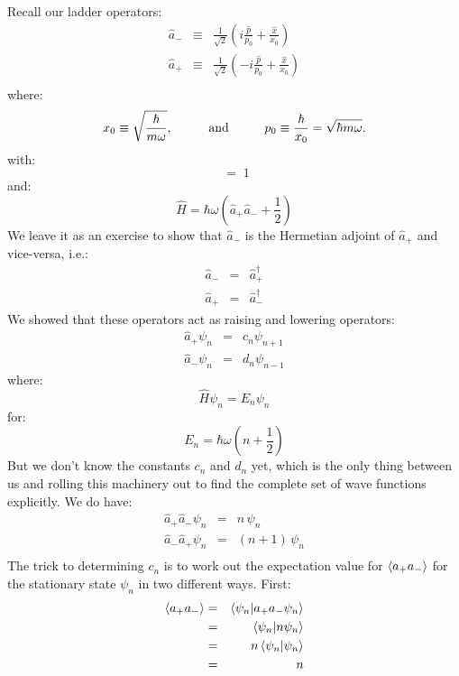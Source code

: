 \documentclass[12pt]{book}
\begin{document}
Recall our ladder operators:
\begin{eqnarray*}
\hat{a}_- &\equiv& \frac{1}{\sqrt{2}}\left(i \frac{\hat{p}}{p_0} + \frac{\hat{x}}{x_0}\right) \\
\hat{a}_+ &\equiv& \frac{1}{\sqrt{2}}\left(-i \frac{\hat{p}}{p_0} + \frac{\hat{x}}{x_0} \right) \\
\end{eqnarray*}
where:
$$x_0 \equiv \sqrt{\frac{\hbar}{m \omega}}, \hspace{1cm} {\rm and} \hspace{1cm} p_0 \equiv \frac{\hbar}{x_0} = \sqrt{\hbar m \omega}.$$
with:
\begin{equation*}
[\hat{a}_-, \hat{a}_+] \; = \;  1
\end{equation*}
and:
\begin{equation*}
\hat{H} =  \hbar\omega \left( \hat{a}_+ \hat{a}_- + \frac{1}{2} \right)
\end{equation*}
We leave it as an exercise to show that $\hat{a}_-$ is the Hermetian adjoint of $\hat{a}_+$ and vice-versa, i.e.:
\begin{eqnarray*}
\hat{a}_- &=& \hat{a}_+^\dagger\\
\hat{a}_+ &=& \hat{a}_-^\dagger
\end{eqnarray*}
We showed that these operators act as raising and lowering operators:
\begin{eqnarray*}
\hat{a}_+ \psi_n &=& c_n \psi_{n+1} \\
\hat{a}_- \psi_n &=& d_n \psi_{n-1} 
\end{eqnarray*}
where:
$$\hat{H}\psi_n = E_n \psi_n$$
for:
$$E_n = \hbar \omega \left(n + \frac{1}{2}\right)$$
But we don't know the constants $c_n$ and $d_n$ yet, which is the only thing between us and rolling this machinery out to find the complete set of wave functions explicitly.
We do have:
\begin{eqnarray*}
\hat{a}_+\hat{a}_- \psi_n &=& n \, \psi_{n} \\
\hat{a}_-\hat{a}_+ \psi_n &=& (n+1) \, \psi_{n} \\
\end{eqnarray*}
The trick to determining $c_n$ is to work out the expectation value for $\braket{a_+a_-}$ 
for the stationary state $\psi_n$ in two different ways.  First:
\begin{eqnarray*}
\braket{a_+a_-} &=& \braket{\psi_n | a_+ a_- \psi_n}\\
 &=& \braket{\psi_n | n \psi_n}\\
 &=& n \braket{\psi_n | \psi_n}\\
 &=& n \\
\end{eqnarray*}
\end{document}
